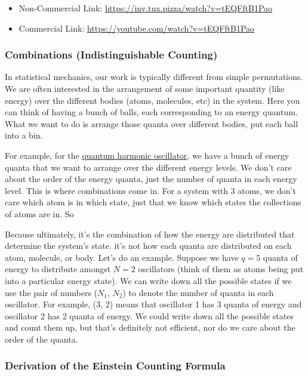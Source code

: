 \begin{itemize}
\tightlist
\item
  Non-Commercial Link: \url{https://inv.tux.pizza/watch?v=tEQFftB1Pao}
\item
  Commercial Link: \url{https://youtube.com/watch?v=tEQFftB1Pao}
\end{itemize}

\subsubsection{Combinations (Indistinguishable
Counting)}\label{combinations-indistinguishable-counting}

In statistical mechanics, our work is typically different from simple
permutations. We are often interested in the arrangement of some
important quantity (like energy) over the different bodies (atoms,
molecules, etc) in the system. Here you can think of having a bunch of
balls, each corresponding to an energy quantum. What we want to do is
arrange those quanta over different bodies, put each ball into a bin.

For example, for the
\href{https://en.wikipedia.org/wiki/Quantum_harmonic_oscillator}{quantum
harmonic oscillator}, we have a bunch of energy quanta that we want to
arrange over the different energy levels. We don't care about the order
of the energy quanta, just the number of quanta in each energy level.
This is where combinations come in. For a system with 3 atoms, we don't
care which atom is in which state, just that we know which states the
collections of atoms are in. So

Because ultimately, it's the combination of how the energy are
distributed that determine the system's state. it's not how each quanta
are distributed on each atom, molecule, or body. Let's do an example.
Suppose we have \(q=5\) quanta of energy to distribute amongst \(N=2\)
oscillators (think of them as atoms being put into a particular energy
state). We can write down all the possible states if we use the pair of
numbers (\(N_1\), \(N_2\)) to denote the number of quanta in each
oscillator. For example, (3, 2) means that oscillator 1 has 3 quanta of
energy and oscillator 2 has 2 quanta of energy. We could write down all
the possible states and count them up, but that's definitely not
efficient, nor do we care about the order of the quanta.

\subsubsection{Derivation of the Einstein Counting
Formula}\label{derivation-of-the-einstein-counting-formula}

